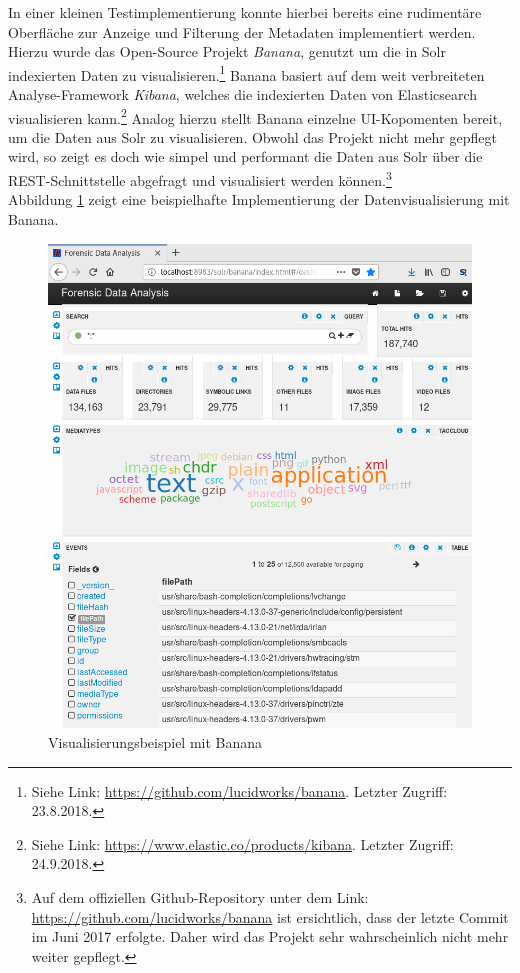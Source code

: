 \noindent
In einer kleinen Testimplementierung konnte hierbei bereits eine rudimentäre Oberfläche zur Anzeige und Filterung der Metadaten implementiert werden. Hierzu wurde das Open-Source Projekt \textit{Banana}, genutzt um die in Solr indexierten Daten zu visualisieren.\footnote{Siehe Link: \url{https://github.com/lucidworks/banana}. Letzter Zugriff: 23.8.2018.} Banana basiert auf dem weit verbreiteten Analyse-Framework \textit{Kibana}, welches die indexierten Daten von Elasticsearch visualisieren kann.\footnote{Siehe Link: \url{https://www.elastic.co/products/kibana}. Letzter Zugriff: 24.9.2018.} Analog hierzu stellt Banana einzelne UI-Kopomenten bereit, um die Daten aus Solr zu visualisieren. Obwohl das Projekt nicht mehr gepflegt wird, so zeigt es doch wie simpel und performant die Daten aus Solr über die REST-Schnittstelle abgefragt und visualisiert werden können.\footnote{Auf dem offiziellen Github-Repository unter dem Link: \url{https://github.com/lucidworks/banana} ist ersichtlich, dass der letzte Commit im Juni 2017 erfolgte. Daher wird das Projekt sehr wahrscheinlich nicht mehr weiter gepflegt.}\\

\noindent
Abbildung \ref{fig:banana_visualization} zeigt eine beispielhafte Implementierung der Datenvisualisierung mit Banana.\\

\begin{figure}[ht]
  \centering
  \includegraphics[width=\textwidth]{./resource/forensicDataAnalysisUI.png}
  \caption{Visualisierungsbeispiel mit Banana}
  \label{fig:banana_visualization}
\end{figure}

